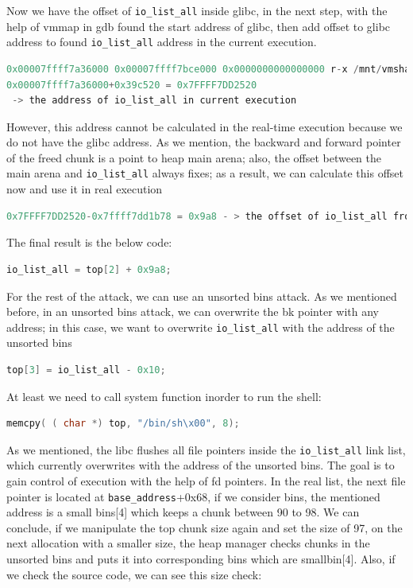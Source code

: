 \documentclass{masterthesis}
\newcommand*\libc{glibc}
\newcommand*\ub{unsorted bins}
\newcommand*\sbs{small bins}
\begin{document}
Now we have the offset of \lstinline{io_list_all} inside \libc{}, in the next step, with the help of vmmap in gdb found the start address of \libc{}, then add offset to \libc{} address to found \lstinline{io_list_all} address in the current execution.
\begin{lstlisting}[language=c,frame=tlrb]
0x00007ffff7a36000 0x00007ffff7bce000 0x0000000000000000 r-x /mnt/vmshare/MasterThesis/libc223/libc.so.6
0x00007ffff7a36000+0x39c520 = 0x7FFFF7DD2520
 -> the address of io_list_all in current execution
\end{lstlisting}



However, this address cannot be calculated in the real-time execution because we do not have the \libc{} address. As we mention, the backward and forward pointer of the freed chunk is a point to heap main arena; also, the offset between the main arena and \lstinline{io_list_all} always fixes; as a result, we can calculate this offset now and use it in real execution
\begin{lstlisting}[language=c,frame=tlrb]
0x7FFFF7DD2520-0x7ffff7dd1b78 = 0x9a8 - > the offset of io_list_all from main arena
\end{lstlisting}

The final result is the below code:

\begin{lstlisting}[language=c,frame=tlrb]
io_list_all = top[2] + 0x9a8;
\end{lstlisting}

For the rest of the attack, we can use an \ub{} attack. As we mentioned before, in an \ub{} attack, we can overwrite the bk pointer with any address; in this case, we want to overwrite \lstinline{io_list_all} with the address of the \ub{}

\begin{lstlisting}[language=c,frame=tlrb]
top[3] = io_list_all - 0x10;
\end{lstlisting}

At least we need to call system function inorder to run the shell:

\begin{lstlisting}[language=c,frame=tlrb]
memcpy( ( char *) top, "/bin/sh\x00", 8);
\end{lstlisting}


As we mentioned, the libc flushes all file pointers inside the \lstinline{io_list_all} link list, which currently overwrites with the address of the \ub{}.
The goal is to gain control of execution with the help of fd pointers. In the real list, the next file pointer is located at \lstinline{base_address}+0x68, if we consider bins, the mentioned address is a \sbs{}[4] which keeps a chunk between 90 to 98. We can conclude, if we manipulate the top chunk size again and set the size of 97, on the next allocation with a smaller size, the heap manager checks chunks in the \ub{} and puts it into corresponding bins which are smallbin[4]. Also, if we check the source code, we can see this size check:
\end{document}
